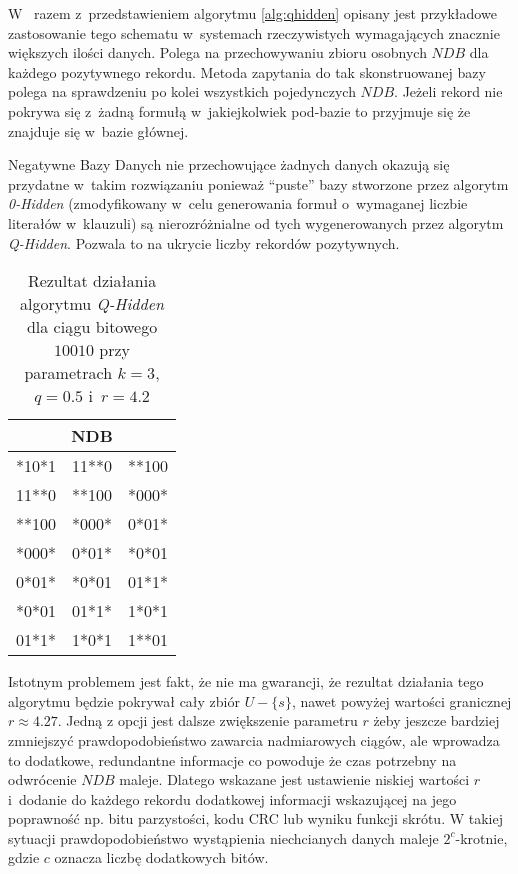 W~\cite{HARD-NDB} razem z~przedstawieniem algorytmu \ref{alg:qhidden} opisany jest przykładowe zastosowanie tego schematu 
w~systemach rzeczywistych wymagających znacznie większych ilości danych. Polega na przechowywaniu zbioru osobnych $NDB$ 
dla każdego pozytywnego rekordu. Metoda zapytania do tak skonstruowanej bazy polega na sprawdzeniu po kolei wszystkich pojedynczych $NDB$.
Jeżeli rekord nie pokrywa się z~żadną formułą w~jakiejkolwiek pod-bazie to przyjmuje się że znajduje się w~bazie głównej.

Negatywne Bazy Danych nie przechowujące żadnych danych okazują się przydatne w~takim rozwiązaniu ponieważ \enquote{puste} bazy stworzone
przez algorytm \textit{0-Hidden} (zmodyfikowany w~celu generowania formuł o~wymaganej liczbie literałów w~klauzuli) są nierozróżnialne
od tych wygenerowanych przez algorytm \textit{Q-Hidden}. Pozwala to na ukrycie liczby rekordów pozytywnych.

\begin{table}[!tb]
    \centering
    \begin{tabular}{|lll|}
        \hline
        \multicolumn{3}{|c|}{NDB} \\ \hline
        *10*1 & 11**0 & **100 \\
        11**0 & **100 & *000* \\
        **100 & *000* & 0*01* \\
        *000* & 0*01* & *0*01 \\
        0*01* & *0*01 & 01*1* \\
        *0*01 & 01*1* & 1*0*1 \\
        01*1* & 1*0*1 & 1**01 \\
        \hline
    \end{tabular}
    \caption{Rezultat działania algorytmu \textit{Q-Hidden} dla ciągu bitowego $10010$ przy parametrach $k=3$, $q=0.5$ i~$r=4.2$}
    \label{tbl:qhidden_results}
\end{table}


Istotnym problemem jest fakt, że nie ma gwarancji, że rezultat działania tego algorytmu będzie pokrywał cały zbiór $U - \{s\}$,
nawet powyżej wartości granicznej $r \approx 4.27$. Jedną z opcji jest dalsze zwiększenie parametru $r$ żeby jeszcze 
bardziej zmniejszyć prawdopodobieństwo zawarcia nadmiarowych ciągów, ale wprowadza to dodatkowe, redundantne informacje co powoduje
że czas potrzebny na odwrócenie $NDB$ maleje. Dlatego wskazane jest  ustawienie niskiej wartości $r$ i~dodanie do każdego rekordu 
dodatkowej informacji wskazującej na jego poprawność np. bitu parzystości, kodu CRC lub wyniku funkcji skrótu.
W takiej sytuacji prawdopodobieństwo wystąpienia niechcianych danych maleje $2^{c}$-krotnie, gdzie $c$ oznacza liczbę dodatkowych bitów.


